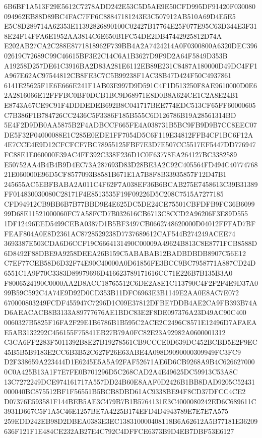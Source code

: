\documentclass[UTF8,fontset=fandol,zihao=-4,a4paper]{ctexart}
\begin{document}
{{6B6BF1A513F29E5612C7278ADD242E53C5D5AE9E50CFD995DF91420F030080094962EB88D89BC4FAC7FF6C88847181243E3C507912AB510A69D4E5E5
E5C8D289714A62353E11392826890100C02427B17764E25F077E95C63D344E3F318E24F14FFA6E1952AA3814C6E650B1FC54DE2DB47442925812D74A
E202AB27CA2C288E8771818962F739BB4A2A7424214A0F0300800A6320DEC39602619C72689C99C46615BF3E2C14C6A1B3627D9F9D2A64F5849D353B
A19258D257DE61C3916BA2D83A281E6112EB89E231C8487A180000D49DC4FF1A967E62AC97544812CB8FE3C7C5B99238F1AC38B47D424F50C4937861
6141E25625F1E6E666E241F1AB03E997D9D591C4F1D513250F8AE9610000D0E62A2816066E12FFFBC0BF0DCB1BC9D68971E8D0B8A624CE1C2A8E24B1
E8743A67CE9C91F4DDDEDEB692B8C041717BEE774EDC513CF65FF60000605C7B386F1B784726CC2436C5F3386F185B555C6D126786B19A28561314BD
5E4F2D9DB0AA5875B2F4ADBCCF665FE4A038731B5BC9FB9D9B7CC8EEC07DE5F32F04000088E1C285E0EDE1FF7054D5C6F119E34812FFB4CF1BC6F12A
4E7CCE4E9D12CFCFCF7BC78955125FBF7E3D7E507CC5517EF5447DD776947FC88E1E060000E39AC4FF392C338F236D1C0F63778EA264127BC3382589
E50752AA4B4B4B9D4EC73A287693D83D28BE3A2C92C405564FD494C4077476821E060000E96D5CF8577093B8581B671E1A7B8F8B33935857F12D47B1
245655AC5EBFBABA2A011C4F62F7A038EF36B6BCAB275E7458613C39B31389FF014830030080C28171F4E8513535F19F09226D5C208C7515A7277185
CFD94912CB9BB6B7B77BBD9E4E625DC5DE24CE75501CBFDFB9FC36B609999D68E11521000060FC7A58FCD7B032616CB6713C8CCD2A96206F3E89D555
1DF12496EED5499CEBA0387D1B5BF3497CB0662748620000D04012FFFAD7BFFEAF804A0E8D2361AC8728529238D7737689612CAF544B274249ACEE74
3693387E503CDA6D6CCF19C6664131490C00009A49624B813C8E8771FCB8588D6D8492F88DBE9A9258DEEA26B159C5ABABAB12BADBDBDB8907C56E12
C7EF77CEB58D6D32F74E90C40000A0D61856FE3BCC9BC7958771A887CD24D6551C1A9F70C3383D89979696D416623789171616CC71E226B7B135B3A0
F8006524190C0000AA2D8ACC18765512C6DE2A8E1C113790C4F2F2F4E9D37A099B59C592C4A74E9D92D0CD353B11DFC6963E3B1149E2AA0E8AC7E072
670000803249FCDF455947C7296D1C09E37812DFBE7DDB4AE2CA9FB393B74AD6AEACACB8B3133A89777676AE1BDC83E2F8DE097376A23D49AC90C400
0060327B5825F16FA2F29E1B6786B1B595C2ACE2C2496C8571E12496D7AFAEAE5AB3132292C456155F75841EB27B79A0FC82E23A92982A0600001312
C3CA6FF2283F5011392B8E27B19278561CB9CCCE0D639DC452BCBD5E2F9EC45B5B5B9183E2CC6B3B52C627F26E63ABE4A098D9090000309949FC3FC9
D2F338659A223444D1E6245E5A5A92FAF52671AE6D6CB9268A9B4C6266270000C0A425B13A1F7E7FE0B701296D5C268CAD2A4E49625DC59913C53A8C
13C7272249DCE974161717A557DD24B60E8AAF0D2426B1BB8DAD9205C52431000040BC875512BF1F56551B5BCB8DBD61AC9338BE94F8CD37DFCC4CE2
D07376E593581F144BEB5AE3C479B7B1B5764131E3C4000080242ED6C689611C3931D667C5F1A5C46E1257BE7A4225B174EFD4D4943789E7E7E7A575
259EDD242EB98D2DBEA0383E3EC138310000408118B6A62612A5B77181E36209636F121F1E484CE232AB27E4C792C4DFFCE6373B9D4EB7DBF53E6127
}}
\end{document}
